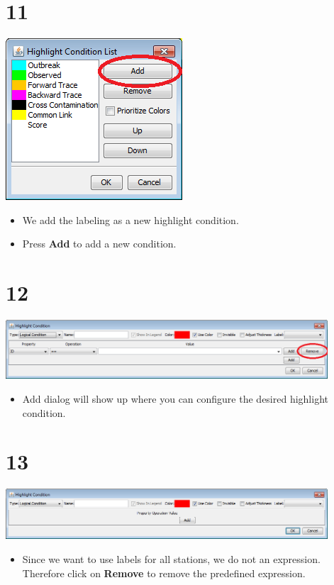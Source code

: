 \documentclass{beamer}
\begin{document}
\section{11}
\begin{frame}
	\begin{center}
  		\includegraphics[height=0.6\textheight]{11.png}
	\end{center}
	\begin{itemize}
		\item We add the labeling as a new highlight condition.
		\item Press \textbf{Add} to add a new condition.
	\end{itemize}
\end{frame}

\section{12}
\begin{frame}
	\begin{center}
  		\includegraphics[width=0.9\textwidth]{12.png}
	\end{center}
	\begin{itemize}
		\item Add dialog will show up where you can configure the desired highlight condition.		
	\end{itemize}
\end{frame}

\section{13}
\begin{frame}
	\begin{center}
  		\includegraphics[width=0.9\textwidth]{13.png}
	\end{center}
	\begin{itemize}
		\item Since we want to use labels for all stations, we do not an expression. Therefore click on \textbf{Remove} to remove the predefined expression.
	\end{itemize}
\end{frame}
\end{document}
